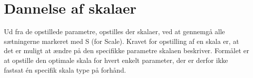 \section{Dannelse af skalaer}
\label{ParametreDatabehandlingSkalaer}
%


Ud fra de opstillede parametre, opstilles der skalaer, ved at gennemgå alle sætningerne markeret med S (for Scale). Kravet for opstilling af en skala er, at det er muligt at ændre på den specifikke parametre skalaen beskriver. Formålet er at opstille den optimale skala for hvert enkelt parameter, der er derfor ikke fastsat én specifik skala type på forhånd. 








